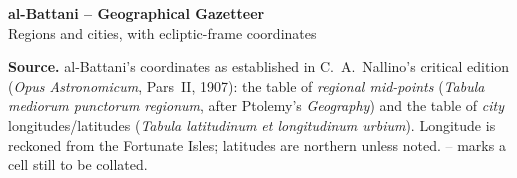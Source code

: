 \documentclass[10pt,a4paper]{article}
\begin{document}
\begin{center}
{\LARGE\bfseries al-Battani -- Geographical Gazetteer}\\[3pt]
{\large Regions and cities, with ecliptic-frame coordinates}
\end{center}
\small\noindent\textbf{Source.} al-Battani's coordinates as established in C.~A.~Nallino's critical edition
(\textit{Opus Astronomicum}, Pars~II, 1907): the table of \emph{regional mid-points}
(\textit{Tabula mediorum punctorum regionum}, after Ptolemy's \textit{Geography}) and the table of
\emph{city} longitudes/latitudes (\textit{Tabula latitudinum et longitudinum urbium}). Longitude is
reckoned from the Fortunate Isles; latitudes are northern unless noted. \textcolor{gray}{--} marks a
cell still to be collated.\\[6pt]
\end{document}
